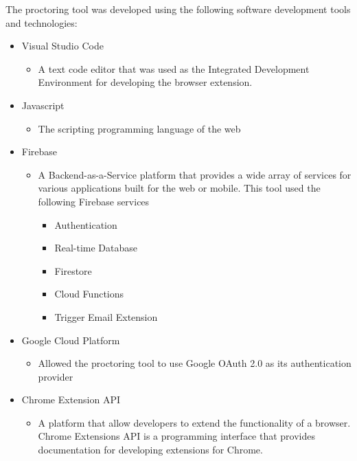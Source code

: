 \documentclass{icsthesis}
\begin{document}
\begin{mainmatter}
The proctoring tool was developed using the following software development tools and technologies:
    \begin{itemize}
        \item Visual Studio Code
          \begin{itemize}
                \item A text code editor that was used as the Integrated Development Environment for developing the browser extension.
            \end{itemize}
    \end{itemize}
    \begin{itemize}
        \item Javascript
          \begin{itemize}
                \item The scripting programming language of the web
            \end{itemize}
    \end{itemize}
    \begin{itemize}
        \item Firebase
          \begin{itemize}
                \item A Backend-as-a-Service platform that provides a wide array of services for various applications built for the web or mobile. This tool used the following Firebase services
                \begin{itemize}
                    \item Authentication
                    \item Real-time Database
                    \item Firestore
                    \item Cloud Functions
                    \item Trigger Email Extension
                \end{itemize}
            \end{itemize}
    \end{itemize}
      \begin{itemize}
        \item Google Cloud Platform
          \begin{itemize}
                \item Allowed the proctoring tool to use Google OAuth 2.0 as its authentication provider
            \end{itemize}
        \end{itemize}
        \begin{itemize}
        \item Chrome Extension API
          \begin{itemize}
                \item A platform that allow developers to extend the functionality of a browser. Chrome Extensions API is a programming interface that provides documentation for developing extensions for Chrome.
            \end{itemize}
    \end{itemize}



\end{mainmatter}
\end{document}
